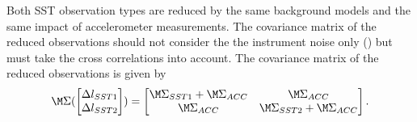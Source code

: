 Both SST observation types are reduced by the same background models and the same impact
of accelerometer measurements. The covariance matrix of the reduced observations should not consider
the the instrument noise only () but must
take the cross correlations  into account.
The covariance matrix of the reduced observations is given by
\begin{equation}
  \M\Sigma(\begin{bmatrix} \Delta l_{SST1} \\ \Delta l_{SST2} \end{bmatrix})
  = \begin{bmatrix} \M\Sigma_{SST1} + \M\Sigma_{ACC} & \M\Sigma_{ACC} \\
                   \M\Sigma_{ACC} & \M\Sigma_{SST2} + \M\Sigma_{ACC}
    \end{bmatrix}.
\end{equation}



